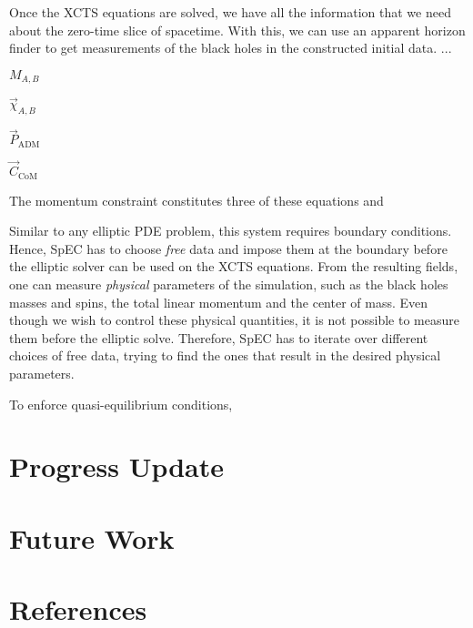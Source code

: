 \documentclass{../document}
\begin{document}
  Once the XCTS equations are solved, we have all the information that we need about the zero-time slice of spacetime. With this, we can use an apparent horizon finder to get measurements of the black holes in the constructed initial data. ...

  $M_{A,B}$

  $\vec\chi_{A,B}$

  $\vec P_\text{ADM}$

  $\vec C_\text{CoM}$

  The momentum constraint constitutes three of these equations and 
  
  Similar to any elliptic PDE problem, this system requires boundary conditions. Hence, SpEC has to choose \textit{free} data and impose them at the boundary before the elliptic solver can be used on the XCTS equations. From the resulting fields, one can measure \textit{physical} parameters of the simulation, such as the black holes masses and spins, the total linear momentum and the center of mass. Even though we wish to control these physical quantities, it is not possible to measure them before the elliptic solve. Therefore, SpEC has to iterate over different choices of free data, trying to find the ones that result in the desired physical parameters.

  To enforce quasi-equilibrium conditions, 

	\section{Progress Update}

	\section{Future Work}

	\section*{References}

	\printbibliography[heading=none]
\end{document}
